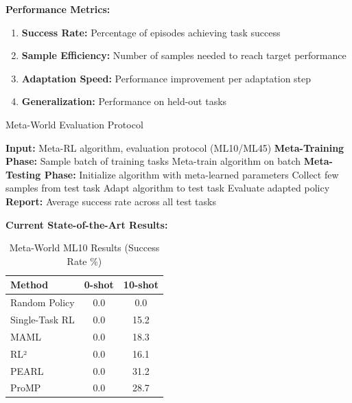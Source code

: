 \documentclass[12pt]{article}
\newcommand{\ieee}[1]{\textcolor{IEEEBlue}{\textbf{#1}}}
\begin{document}
{{			\ieee{Performance Metrics:}
			
			\begin{enumerate}
				\item \textbf{Success Rate:} Percentage of episodes achieving task success
				\item \textbf{Sample Efficiency:} Number of samples needed to reach target performance
				\item \textbf{Adaptation Speed:} Performance improvement per adaptation step
				\item \textbf{Generalization:} Performance on held-out tasks
			\end{enumerate}
			
			\begin{algorithm}[H]
			\caption{Meta-World Evaluation Protocol}
			\begin{algorithmic}[1]
			\STATE \textbf{Input:} Meta-RL algorithm, evaluation protocol (ML10/ML45)
			\STATE \textbf{Meta-Training Phase:}
			\STATE Sample batch of training tasks
			\STATE Meta-train algorithm on batch
			\ENDFOR
			\STATE \textbf{Meta-Testing Phase:}
			\STATE Initialize algorithm with meta-learned parameters
			\STATE Collect few samples from test task
			\STATE Adapt algorithm to test task
			\STATE Evaluate adapted policy
			\ENDFOR
			\ENDFOR
			\STATE \textbf{Report:} Average success rate across all test tasks
			\end{algorithmic}
			\end{algorithm}
			
			\ieee{Current State-of-the-Art Results:}
			
			\begin{table}[H]
			\centering
			\caption{Meta-World ML10 Results (Success Rate \%)}
			\begin{tabular}{@{}lcc@{}}
			\toprule
			\textbf{Method} & \textbf{0-shot} & \textbf{10-shot} \\
			\midrule
			Random Policy & 0.0 & 0.0 \\
			Single-Task RL & 0.0 & 15.2 \\
			MAML & 0.0 & 18.3 \\
			RL² & 0.0 & 16.1 \\
			PEARL & 0.0 & 31.2 \\
			ProMP & 0.0 & 28.7 \\
			\bottomrule
			\end{tabular}
			\label{tab:metaworld_results}
			\end{table}
			
}}
\end{document}
